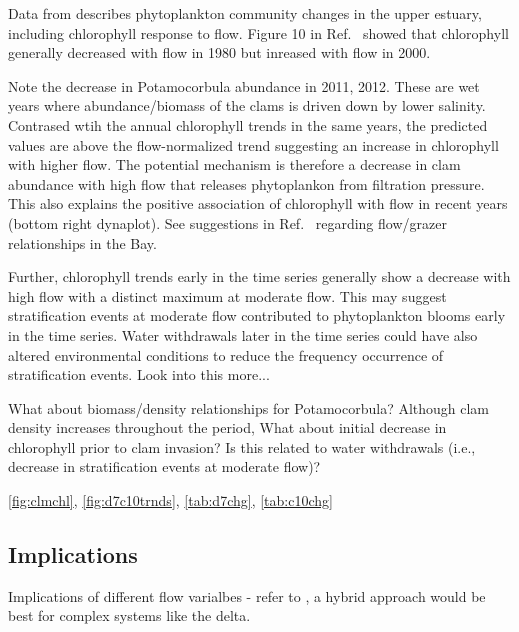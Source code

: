 \documentclass[journal = esthag, manuscript = article]{achemso}\usepackage[]{graphicx}\usepackage[]{color}
\begin{document}
Data from \cite{Crauder16,Jassby08} describes phytoplankton community changes in the upper estuary, including chlorophyll response to flow.  Figure 10 in Ref.~ showed that chlorophyll generally decreased with flow in 1980 but inreased with flow in 2000.

Note the decrease in Potamocorbula abundance in 2011, 2012.  These are wet years where abundance/biomass of the clams is driven down by lower salinity.  Contrased wtih the annual chlorophyll trends in the same years, the predicted values are above the flow-normalized trend suggesting an increase in chlorophyll with higher flow.  The potential mechanism is therefore a decrease in clam abundance with high flow that releases phytoplankon from filtration pressure.  This also explains the positive association of chlorophyll with flow in recent years (bottom right dynaplot). See suggestions in Ref.~ regarding flow/grazer relationships in the Bay. 

Further, chlorophyll trends early in the time series generally show a decrease with high flow with a distinct maximum at moderate flow.  This may suggest stratification events at moderate flow contributed to phytoplankton blooms early in the time series. Water withdrawals later in the time series could have also altered environmental conditions to reduce the frequency occurrence of stratification events.  Look into this more...

What about biomass/density relationships for Potamocorbula?  Although clam density increases throughout the period,  What about initial decrease in chlorophyll prior to clam invasion?  Is this related to water withdrawals (i.e., decrease in stratification events at moderate flow)?

\cref{fig:clmchl}, \cref{fig:d7c10trnds}, \cref{tab:d7chg}, \cref{tab:c10chg}

\subsection{Implications}

Implications of different flow varialbes - refer to \cite{Novick15}, a hybrid approach would be best for complex systems like the delta.
\end{document}
